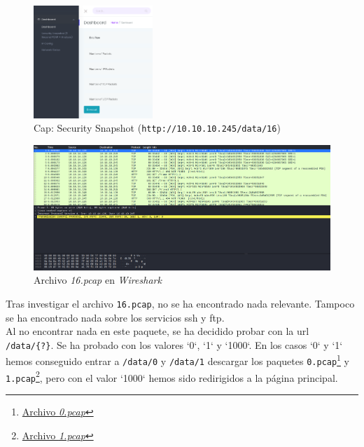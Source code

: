 \begin{figure}[h]
    \centering
    \includegraphics[width=0.40\textwidth]{images/machines/cap/web-sec-snapshots.png}
    \caption{Cap: Security Snapshot (\texttt{http://10.10.10.245/data/16})}
    \label{fig:cap-snapshot}
\end{figure}

\begin{figure}[h]
    \centering
    \includegraphics[width=1.0\textwidth]{images/machines/cap/wireshark-16.png}
    \caption{Archivo \textit{16.pcap} en \textit{Wireshark}}
    \label{fig:cap-wire-16}
\end{figure}

Tras investigar el archivo \texttt{16.pcap}, no se ha encontrado nada relevante. Tampoco se ha encontrado nada sobre los servicios \acrshort{ssh} y \acrshort{ftp}.\\

Al no encontrar nada en este paquete, se ha decidido probar con la \acrshort{url} \texttt{/data/\{?\}}. Se ha probado con los valores `0`, `1` y `1000`. En los casos `0` y `1` hemos conseguido entrar a \texttt{/data/0} y \texttt{/data/1} descargar los paquetes \texttt{0.pcap}\footnote{\href{https://github.com/VictorNS69/TFM/blob/main/machines/cap/pcaps/0.pcap}{Archivo \textit{0.pcap}}} y \texttt{1.pcap}\footnote{\href{https://github.com/VictorNS69/TFM/blob/main/machines/cap/pcaps/1.pcap}{Archivo \textit{1.pcap}}}, pero con el valor `1000` hemos sido redirigidos a la página principal.\\

